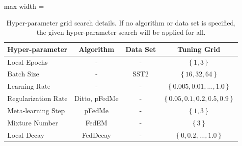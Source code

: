 \begin{table}[htbp]
    \centering
    
    \begin{adjustbox}{max width = \linewidth}
        \begin{tabular}{|l|c|c|c|}
        \hline
            Hyper-parameter & Algorithm & Data Set & Tuning Grid \\
            \hline
            Local Epochs & - & - & $\left\{ 1, 3 \right\}$ \\
            Batch Size & - & SST2 & $\left\{ 16, 32, 64 \right\}$ \\
            Learning Rate & - & - & $\left\{ 0.005, 0.01, \ldots, 1.0 \right\}$ \\
            Regularization Rate & Ditto, pFedMe & - & $\left\{ 0.05, 0.1, 0.2, 0.5, 0.9 \right\}$ \\
            Meta-learning Step & pFedMe & - & $\left\{ 1, 3 \right\}$ \\
            Mixture Number & FedEM & - & $\left\{ 3 \right\}$ \\
            Local Decay & FedDecay & - & $\left\{0, 0.2, \ldots, 1.0 \right\}$ \\
            \hline
        \end{tabular}
    \end{adjustbox}
    
    \caption{
        Hyper-parameter grid search details. If no algorithm or data set is specified, the given hyper-parameter search will be applied for all.
    }
    \label{tab: tuning--grid}
\end{table}
